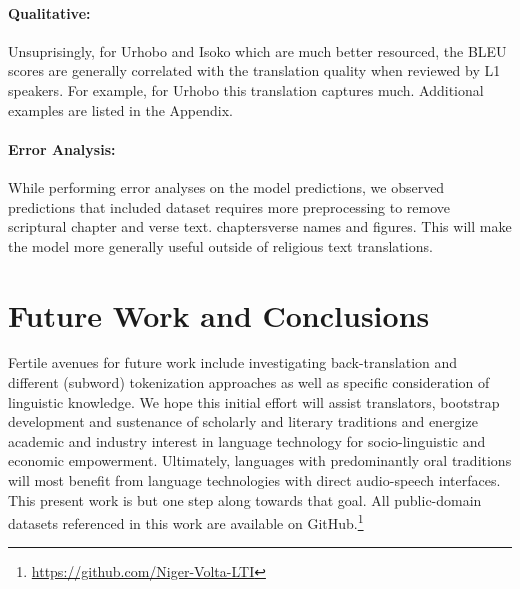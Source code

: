 \documentclass{article} %
\begin{document}
\paragraph{Qualitative:} Unsuprisingly, for Urhobo and Isoko which are much better resourced, the BLEU scores are generally correlated with the translation quality when reviewed by L1 speakers. For example, for Urhobo this translation captures much. Additional examples are listed in the Appendix.

\paragraph{Error Analysis:} While performing error analyses on the model predictions, we observed predictions that included  dataset requires more preprocessing to remove scriptural chapter and verse text.  chapters\/verse names and figures. This will make the model more generally useful outside of religious text translations.

\section{Future Work and Conclusions}
Fertile avenues for future work include investigating back-translation and different (subword) tokenization approaches as well as specific consideration of linguistic knowledge. We hope this initial effort will assist translators, bootstrap development and sustenance of scholarly and literary traditions and energize academic and industry interest in language technology for socio-linguistic and economic empowerment. Ultimately, languages with predominantly oral traditions will most benefit from language technologies with direct audio-speech interfaces. This present work is but one step along towards that goal. All public-domain datasets referenced in this work are available on GitHub.\footnote{\url{https://github.com/Niger-Volta-LTI}}
 
% 
\end{document}
